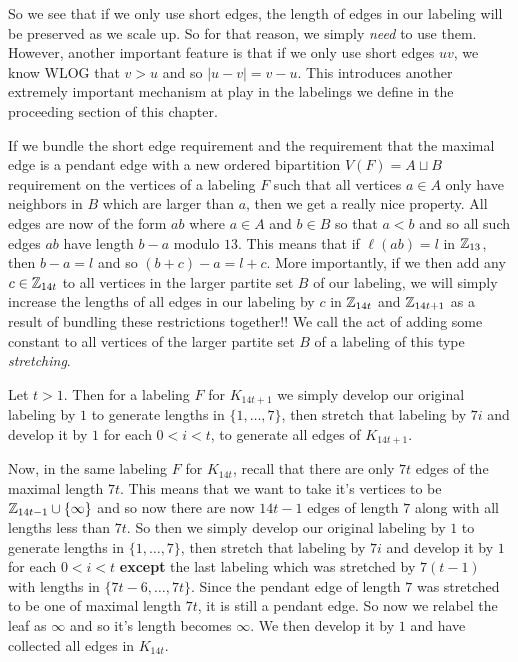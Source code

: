   So we see that if we only use short edges, the length of edges in our labeling will be preserved as we scale up. So for that reason, we simply \textit{need} to use them. However, another important feature is that if we only use short edges $uv$, we know WLOG that $v>u$ and so $|u-v|=v-u$. This introduces another extremely important mechanism at play in the labelings we define in the proceeding section of this chapter.

  If we bundle the short edge requirement and the requirement that the maximal edge is a pendant edge with a new ordered bipartition $V(F)=A\sqcup B$ requirement on the vertices of a labeling $F$ such that all vertices $a\in A$ only have neighbors in $B$ which are larger than $a$, then we get a really nice property. All edges are now of the form $ab$ where $a\in A$ and $b\in B$ so that $a<b$ and so all such edges $ab$ have length $b-a$ modulo $13$. This means that if $\ell(ab)=l$ in $\mathbb{Z}_{13}$, then $b-a=l$ and so $(b+c)-a=l+c$. More importantly, if we then add any $c\in \mathbb{Z}_{14t}$ to all vertices in the larger partite set $B$ of our labeling, we will simply increase the lengths of all edges in our labeling by $c$ in $\mathbb{Z}_{14t}$ and $\mathbb{Z}_{14t+1}$ as a result of bundling these restrictions together!! We call the act of adding some constant to all vertices of the larger partite set $B$ of a labeling of this type \textit{stretching}.

  Let $t>1$. Then for a labeling $F$ for $K_{14t+1}$ we simply develop our original labeling by $1$ to generate lengths in $\{1,\hdots,7\}$, then stretch that labeling by $7i$ and develop it by $1$ for each $0<i<t$, to generate all edges of $K_{14t+1}$. 
  
  Now, in the same labeling $F$ for $K_{14t}$, recall that there are only $7t$ edges of the maximal length $7t$. This means that we want to take it's vertices to be $\mathbb{Z}_{14t-1}\cup \{\infty\}$ and so now there are now $14t-1$ edges of length $7$ along with all lengths less than $7t$. So then we simply develop our original labeling by $1$ to generate lengths in $\{1,\hdots,7\}$, then stretch that labeling by $7i$ and develop it by $1$ for each $0<i<t$ \textbf{except} the last labeling which was stretched by $7(t-1)$ with lengths in $\{7t-6,\hdots,7t\}$. Since the pendant edge of length $7$ was stretched to be one of maximal length $7t$, it is still a pendant edge. So now we relabel the leaf as $\infty$ and so it's length becomes $\infty$. We then develop it by $1$ and have collected all edges in $K_{14t}$.

